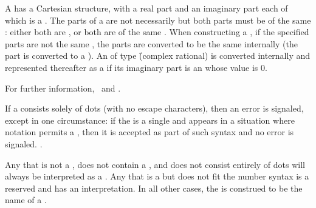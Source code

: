 
A  has a Cartesian structure, 
with a real part and an imaginary part each of which is a 
.
The parts of a  are not necessarily  
but both parts must be of the same : 
either both are , or both are of the same  .
When constructing a , if the specified parts are not the
same , the parts are converted to be the same 
internally (\ie the  part is converted to a ). 
An  of type \f{(complex rational)} is converted internally
and represented thereafter as a  if its imaginary part is an 
 whose value is 0.

For further information, \seesection\SharpsignC\ and \secref\PrintingComplexes.

\endsubsubsection%

\endsubsection%


If a  consists solely of dots (with no escape characters),
then an error  is signaled,
except in one circumstance:
if the  is a single 
and appears in a situation where  notation permits a ,
then it is accepted as part of such syntax and no error is signaled. 
\Seesection\LeftParen.

\endsubsection%


Any  that is not a ,
does not contain a ,
and does not consist entirely of dots
will always be interpreted as a .
Any  that is a  but does not fit the       
number syntax is a reserved  and
has an  interpretation.
In all other cases, the  is construed to be the name of a .

